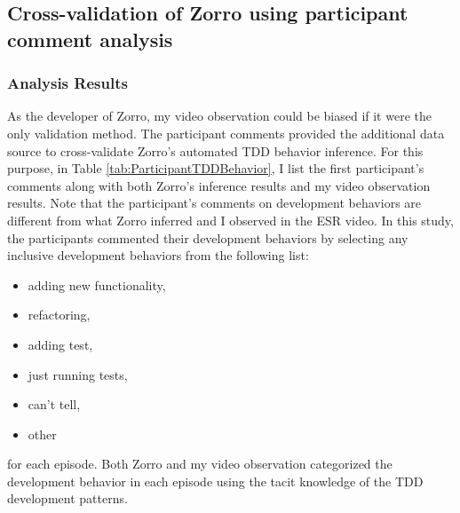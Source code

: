 \subsection{Cross-validation of Zorro using participant comment analysis}

\subsubsection{Analysis Results}
As the developer of Zorro, my video observation could be biased if it were
the only validation method. The participant comments provided the additional 
data source to cross-validate Zorro's automated TDD behavior inference. 
For this purpose, in Table \ref{tab:ParticipantTDDBehavior}, I list the first
participant's comments along with both Zorro's inference results and my
video observation results. Note that the participant's comments on 
development behaviors are different from what Zorro inferred and I 
observed in the ESR video. In this study, the participants commented their 
development behaviors by selecting any inclusive development behaviors from 
the following list: 
\begin{itemize}
\item adding new functionality,
\item refactoring,
\item adding test,
\item just running tests,
\item can't tell,
\item other
\end{itemize}
for each episode. Both Zorro and my video observation categorized the
development behavior in each episode using the tacit knowledge of the
TDD development patterns.

